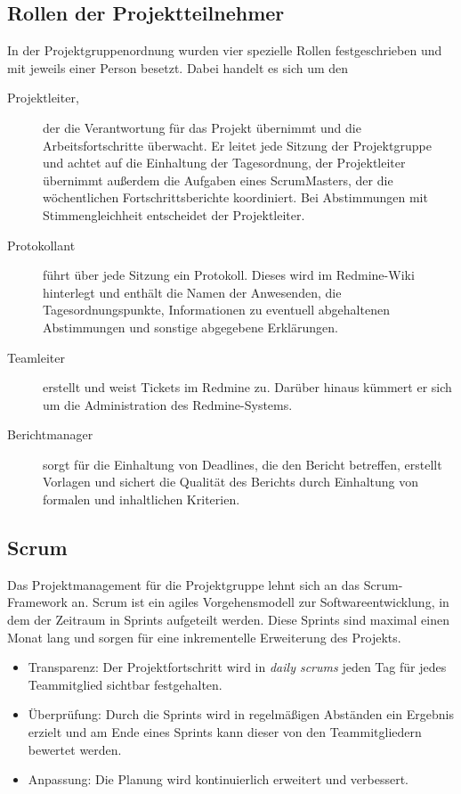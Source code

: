 \subsection{Rollen der Projektteilnehmer}
\label{sec:orga:projekt:rollen}

In der Projektgruppenordnung wurden vier spezielle Rollen festgeschrieben und mit jeweils einer Person besetzt. Dabei handelt es sich um den

\begin{description}
\item[Projektleiter,] der die Verantwortung für das Projekt übernimmt und die
Arbeitsfortschritte überwacht. Er leitet jede Sitzung der Projektgruppe und
achtet auf die Einhaltung der Tagesordnung, der Projektleiter übernimmt außerdem
die Aufgaben eines ScrumMasters, der die wöchentlichen Fortschrittsberichte
koordiniert. Bei Abstimmungen mit Stimmengleichheit entscheidet der
Projektleiter.

\item[Protokollant] führt über jede Sitzung ein Protokoll. Dieses wird im
Redmine-Wiki hinterlegt und enthält die Namen der Anwesenden, die
Tagesordnungspunkte, Informationen zu eventuell abgehaltenen Abstimmungen und
sonstige abgegebene Erklärungen.

\item[Teamleiter] erstellt und weist Tickets im Redmine zu. Darüber hinaus
kümmert er sich um die Administration des Redmine-Systems.

\item[Berichtmanager] sorgt für die Einhaltung von Deadlines, die den Bericht
betreffen, erstellt Vorlagen und sichert die Qualität des Berichts durch
Einhaltung von formalen und inhaltlichen Kriterien.
\end{description}

\subsection{Scrum}
\label{sec:orga:projekt:scrum}

Das Projektmanagement für die Projektgruppe lehnt sich an das Scrum-Framework
an. Scrum ist ein agiles Vorgehensmodell zur Softwareentwicklung, in dem der
Zeitraum in Sprints aufgeteilt werden. Diese Sprints sind maximal einen Monat
lang und sorgen für eine inkrementelle Erweiterung des Projekts.

\begin{itemize}
\item Transparenz: Der Projektfortschritt wird in \textit{daily scrums} jeden
  Tag für jedes Teammitglied sichtbar festgehalten.
\item Überprüfung: Durch die Sprints wird in regelmäßigen Abständen ein Ergebnis
  erzielt und am Ende eines Sprints kann dieser von den Teammitgliedern bewertet
  werden.
\item Anpassung: Die Planung wird kontinuierlich erweitert und verbessert.
\end{itemize}

